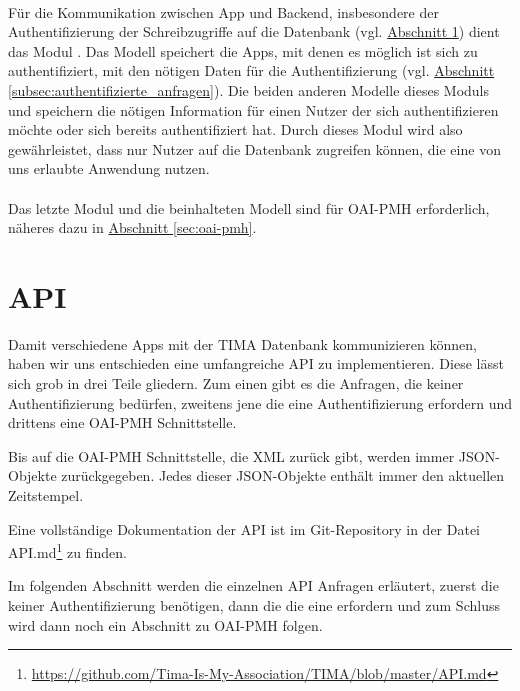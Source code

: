 \paragraph{} Für die Kommunikation zwischen App und Backend, insbesondere der Authentifizierung der Schreibzugriffe auf die Datenbank (vgl. \hyperref[sec:api]{Abschnitt \ref*{sec:api}}) dient das Modul . Das Modell  speichert die Apps, mit denen es möglich ist sich zu authentifiziert, mit den nötigen Daten für die Authentifizierung (vgl. \hyperref[subsec:authentifizierte_anfragen]{Abschnitt \ref*{subsec:authentifizierte_anfragen}}). Die beiden anderen Modelle dieses Moduls  und  speichern die nötigen Information für einen Nutzer der sich authentifizieren möchte oder sich bereits authentifiziert hat. Durch dieses Modul wird also gewährleistet, dass nur Nutzer auf die Datenbank zugreifen können, die eine von uns erlaubte Anwendung nutzen.

\paragraph{} Das letzte Modul und die beinhalteten Modell sind für OAI-PMH erforderlich, näheres dazu in \hyperref[sec:oai-pmh]{Abschnitt \ref*{sec:oai-pmh}}.


\section{API}\label{sec:api}
Damit verschiedene Apps mit der TIMA Datenbank kommunizieren können, haben
wir uns entschieden eine umfangreiche API zu implementieren. Diese lässt sich
grob in drei Teile gliedern. Zum einen gibt es die Anfragen, die keiner
Authentifizierung bedürfen, zweitens jene die eine Authentifizierung erfordern und
drittens eine OAI-PMH Schnittstelle.

Bis auf die OAI-PMH Schnittstelle, die XML zurück gibt, werden immer JSON-Objekte zurückgegeben. Jedes dieser JSON-Objekte enthält immer den aktuellen Zeitstempel.

Eine vollständige Dokumentation der API ist im Git-Repository in der Datei API.md\footnote{\url{https://github.com/Tima-Is-My-Association/TIMA/blob/master/API.md}} zu finden.

Im folgenden Abschnitt werden die einzelnen API Anfragen erläutert, zuerst die keiner Authentifizierung benötigen, dann die die eine erfordern und zum Schluss wird dann noch ein Abschnitt zu OAI-PMH folgen.

